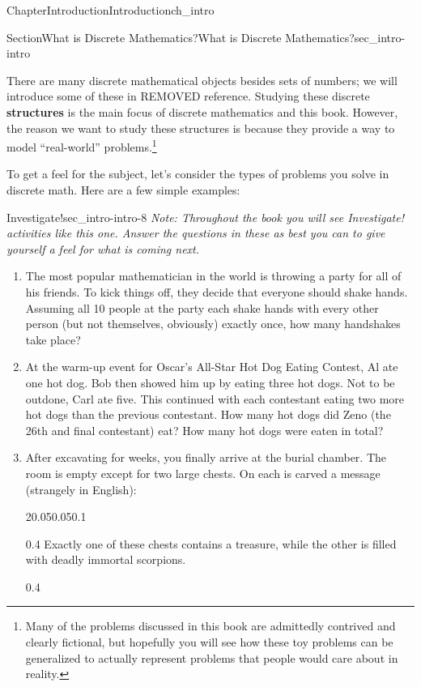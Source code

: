 \documentclass[twoside,11pt,]{book}
\newcommand{\terminology}[1]{\textbf{#1}}
\numberwithin{equation}{chapter}
\begin{document}
\begin{chapterptx}{Chapter}{Introduction}{}{Introduction}{}{}{ch_intro}
\begin{sectionptx}{Section}{What is Discrete Mathematics?}{}{What is Discrete Mathematics?}{}{}{sec_intro-intro}
\par
There are many discrete mathematical objects besides sets of numbers; we will introduce some of these in  REMOVED reference. Studying these discrete \terminology{structures} is the main focus of discrete mathematics and this book. However, the reason we want to study these structures is because they provide a way to model ``real-world'' problems.\footnote{Many of the problems discussed in this book are admittedly contrived and clearly fictional, but hopefully you will see how these toy problems can be generalized to actually represent problems that people would care about in reality.\label{sec_intro-intro-6-3}}%
\par
To get a feel for the subject, let's consider the types of problems you solve in discrete math. Here are a few simple examples:%
\begin{investigation}{Investigate!}{}{sec_intro-intro-8}%
\emph{Note: Throughout the book you will see \emph{Investigate!} activities like this one. Answer the questions in these as best you can to give yourself a feel for what is coming next.}%
\par
%
\begin{enumerate}
\item{}The most popular mathematician in the world is throwing a party for all of his friends. To kick things off, they decide that everyone should shake hands. Assuming all 10 people at the party each shake hands with every other person (but not themselves, obviously) exactly once, how many handshakes take place?%
\item{}At the warm-up event for Oscar's All-Star Hot Dog Eating Contest, Al ate one hot dog. Bob then showed him up by eating three hot dogs. Not to be outdone, Carl ate five. This continued with each contestant eating two more hot dogs than the previous contestant. How many hot dogs did Zeno (the 26th and final contestant) eat? How many hot dogs were eaten in total?%
\item{}After excavating for weeks, you finally arrive at the burial chamber. The room is empty except for two large chests. On each is carved a message (strangely in English):%
\begin{sidebyside}{2}{0.05}{0.05}{0.1}%
\begin{sbspanel}{0.4}%
Exactly one of these chests contains a treasure, while the other is filled with deadly immortal scorpions.%
\end{sbspanel}%
\begin{sbspanel}{0.4}%
\par

\end{sbspanel}
\end{sidebyside}
\end{enumerate}
\end{investigation}
\end{sectionptx}
\end{chapterptx}
\end{document}
